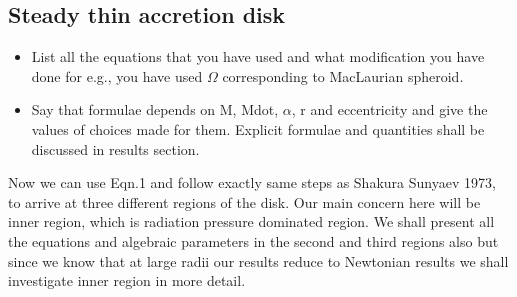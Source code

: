 \documentclass[useAMS,usenatbib]{mn2e}
\begin{document}
\subsection{Steady thin accretion disk}
\begin{itemize}
\item List all the equations that you have used and what modification
  you have done for e.g., you have used $\Omega$ corresponding to
  MacLaurian spheroid. 
\item Say that formulae depends on M, Mdot, $\alpha$, r and
  eccentricity and give the values of choices made for them. 
  Explicit formulae and quantities shall be discussed in results
  section.
\end{itemize}
Now we can use Eqn.1 and follow exactly same steps as Shakura Sunyaev 1973, to arrive at three different regions of the disk. Our main concern here will be inner region, which is radiation pressure dominated region. We shall present all the equations and algebraic parameters in the second and third regions also but since we know that at large radii our results reduce to Newtonian results we shall investigate inner region in more detail.
\end{document}
